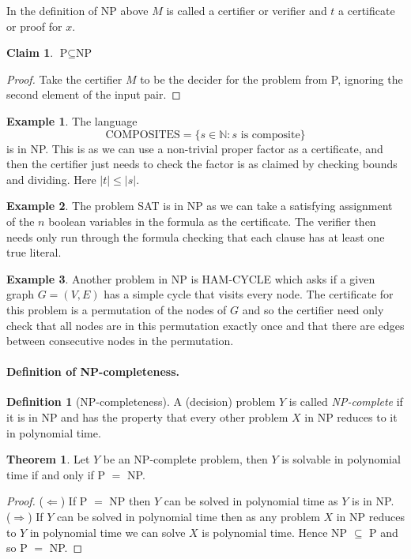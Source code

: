 \documentclass[11pt,a4paper]{article}
\theoremstyle{definition}
\newtheorem{thm}{Theorem}
\newtheorem{claim}{Claim}
\newtheorem{defn}{Definition}
\newtheorem{ex}{Example}
\newcommand{\NN}{\mathbb{N}}
\begin{document}
In the definition of NP above $M$ is called a certifier or verifier and $t$ a certificate or proof for $x$.
\begin{claim}
$\text{P}\subseteq \text{NP}$
\end{claim}
\begin{proof}
Take the certifier $M$ to be the decider for the problem from P, ignoring the second element of the input pair.
\end{proof}

\begin{ex}
The language
\[
\text{COMPOSITES} = \{s\in \NN : s \text{ is composite}\}
\]
is in NP.
This is as we can use a non-trivial proper factor as a certificate, and then the certifier just needs to check the factor is as claimed by checking bounds and dividing.
Here $|t| \le |s|$.
\end{ex}

\begin{ex}
The problem SAT is in NP as we can take a satisfying assignment of the $n$ boolean variables in the formula as the certificate.
The verifier then needs only run through the formula checking that each clause has at least one true literal.
\end{ex}

\begin{ex}
Another problem in NP is HAM-CYCLE which asks if a given graph $G = (V,E)$ has a simple cycle that visits every node.
The certificate for this problem is a permutation of the nodes of $G$ and so the certifier need only check that all nodes are in this permutation exactly once and that there are edges between consecutive nodes in the permutation.
\end{ex}

\paragraph{Definition of NP-completeness.}
\begin{defn}[NP-completeness]
A (decision) problem $Y$ is called \emph{NP-complete} if it is in NP and has the property that every other problem $X$ in NP reduces to it in polynomial time.
\end{defn}

\begin{thm}
Let $Y$ be an NP-complete problem, then $Y$ is solvable in polynomial time if and only if P $=$ NP.
\end{thm}
\begin{proof}
($\Leftarrow$) If P $=$ NP then $Y$ can be solved in polynomial time as $Y$ is in NP.\\
($\Rightarrow$) If $Y$ can be solved in polynomial time then as any problem $X$ in NP reduces to $Y$ in polynomial time we can solve $X$ is polynomial time.
Hence NP $\subseteq$ P and so P $=$ NP.
\end{proof}
\end{document}
